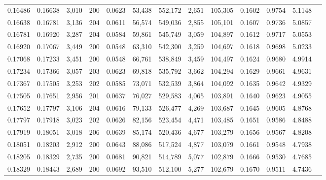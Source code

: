 \begin{tabular}{rrrrrrrrrrrrr}
0.16486 & 0.16638 & 3,010 & 200 &                                     0.0623 &  53,438 & 552,172 &   2,651 & 105,305 & 0.1602 & 0.9754 & 5.1148 \\
0.16638 & 0.16781 & 3,136 & 204 &                                     0.0611 &  56,574 & 549,036 &   2,855 & 105,101 & 0.1607 & 0.9736 & 5.0857 \\
0.16781 & 0.16920 & 3,287 & 204 &                                     0.0584 &  59,861 & 545,749 &   3,059 & 104,897 & 0.1612 & 0.9717 & 5.0553 \\
0.16920 & 0.17067 & 3,449 & 200 &                                     0.0548 &  63,310 & 542,300 &   3,259 & 104,697 & 0.1618 & 0.9698 & 5.0233 \\
0.17068 & 0.17233 & 3,451 & 200 &                                     0.0548 &  66,761 & 538,849 &   3,459 & 104,497 & 0.1624 & 0.9680 & 4.9914 \\
0.17234 & 0.17366 & 3,057 & 203 &                                     0.0623 &  69,818 & 535,792 &   3,662 & 104,294 & 0.1629 & 0.9661 & 4.9631 \\
0.17367 & 0.17505 & 3,253 & 202 &                                     0.0585 &  73,071 & 532,539 &   3,864 & 104,092 & 0.1635 & 0.9642 & 4.9329 \\
0.17505 & 0.17651 & 2,956 & 201 &                                     0.0637 &  76,027 & 529,583 &   4,065 & 103,891 & 0.1640 & 0.9623 & 4.9055 \\
0.17652 & 0.17797 & 3,106 & 204 &                                     0.0616 &  79,133 & 526,477 &   4,269 & 103,687 & 0.1645 & 0.9605 & 4.8768 \\
0.17797 & 0.17918 & 3,023 & 202 &                                     0.0626 &  82,156 & 523,454 &   4,471 & 103,485 & 0.1651 & 0.9586 & 4.8488 \\
0.17919 & 0.18051 & 3,018 & 206 &                                     0.0639 &  85,174 & 520,436 &   4,677 & 103,279 & 0.1656 & 0.9567 & 4.8208 \\
0.18051 & 0.18203 & 2,912 & 200 &                                     0.0643 &  88,086 & 517,524 &   4,877 & 103,079 & 0.1661 & 0.9548 & 4.7938 \\
0.18205 & 0.18329 & 2,735 & 200 &                                     0.0681 &  90,821 & 514,789 &   5,077 & 102,879 & 0.1666 & 0.9530 & 4.7685 \\
0.18329 & 0.18443 & 2,689 & 200 &                                     0.0692 &  93,510 & 512,100 &   5,277 & 102,679 & 0.1670 & 0.9511 & 4.7436 \\

\end{tabular}
